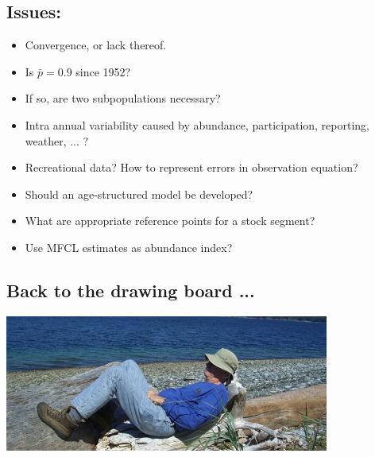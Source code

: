 \documentclass[a4paper,KOMA,landscape,titlepage]{powersem}
\begin{document}
\begin{slide}\section{Issues:}
\begin{itemize}
\item Convergence, or lack thereof.
\item Is $\bar{p} = 0.9$ since 1952?
\item If so, are two subpopulations necessary?
\item Intra annual variability caused by abundance, participation,
reporting, weather, ... ?
\item Recreational data? How to represent errors in observation
equation?
\item Should an age-structured model be developed?
\item What are appropriate reference points for a stock segment?
\item Use MFCL estimates as abundance index?
\end{itemize}
\end{slide}

\begin{slide}\section{Back to the drawing board ...}
\begin{center}
\includegraphics[width=0.8\textwidth]{./graphics/recumbant.png}
\end{center}
\end{slide}

\end{document}
